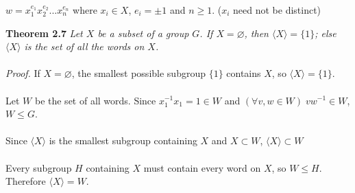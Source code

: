 \documentclass{article}
\begin{document}
\(w=x_{1}^{e_{1}}x_{2}^{e_{2}}...x_{n}^{e_{n}}\) where \(x_{i}\in X\), \(e_{i}=\pm 1\) and \(n\ge 1\). (\(x_{i}\) need not be distinct)\\
\begin{redrules}\color{red}
\textbf{Theorem 2.7} \textit{Let \(X\) be a subset of a group \(G\). If \(X=\varnothing\), then \(\langle X\rangle=\{1\}\); else \(\langle X\rangle\) is the set of all the words on \(X\).}\\\\\color{black}
\textit{Proof.} If \(X=\varnothing\), the smallest possible subgroup \(\{1\}\) contains \(X\), so \(\langle X\rangle=\{1\}\).\\\\
Let \(W\) be the set of all words. Since \(x_{1}^{-1}x_{1}=1\in W\) and \((\forall v,w\in W)\;vw^{-1}\in W\), \(W\le G\).\\\\
Since \(\langle X\rangle\) is the smallest subgroup containing \(X\) and \(X\subset W\), \(\langle X\rangle\subset W\)\\\\
Every subgroup \(H\) containing \(X\) must contain every word on \(X\), so \(W\le H\). Therefore \(\langle X\rangle=W\).
\end{redrules}
\end{document}
